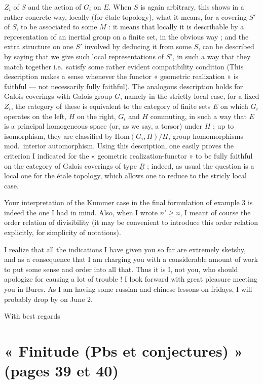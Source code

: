 \documentclass[11pt,a4paper]{article}
\begin{document}
$Z_i$ of $S$ and the action of $G_i$ on $E$. When $S$ is again arbitrary, this
shows in a rather concrete way, locally (for étale topology), what it means,
for a covering $S'$ of $S$, to be associated to some $M$ : it means that
locally it is describable by a representation of an inertial group on a finite
set, in the obvious way ; and the extra structure on one $S'$ involved by
deducing it from some $S$, can be described by saying that we give such local
representations of $S'$, in such a way that they match together i.e.\ satisfy
some rather evident compatibility condition (This description makes a sense
whenever the functor « geometric realization » is faithful --- not necessarily
fully faithful). The analogous description holds for Galois coverings with
Galois group $G$, namely in the strictly local case, for a fixed $Z_i$, the
\struck{\ill{}} category of these is equivalent to the category of finite sets
$E$ on which $G_i$ operates on the left, $H$ on the right, $G_i$ and $H$
commuting, in such a way that $E$ is a principal homogeneous space (or, as we
say, a torsor) under $H$ ; up to isomorphism, they are classified by
$\mathrm{Hom}(G_i, H)/H$, group homomorphisms mod.\ interior automorphism.
Using this description, one easily proves the criterion I indicated for the
« geometric realization-functor » to be fully faithful on the category of
Galois coverings of type $\underline{R}$ ; indeed, as usual the question is a
local one for the étale topology, which allows one to reduce to the stricly
local case.

Your interpretation of the Kummer case in the final formulation of example 3 is
indeed the one I had in mind. Also, when I wrote $n' \geqslant n$, I meant of
course the order relation of divisibility (it may be convenient to introduce
this order relation explicitly, for simplicity of notations).

I realize that all the indications I have given you so far are extremely
sketshy, and as a consequence that I am charging you with a considerable amount
of work to put some sense and order into all that. Thus it is I, not you, who
should apologize for causing a lot of trouble ! I look forward with great
pleasure meeting you in Bures. As I am having some russian and chinese lessons
on fridays, I will probably drop by on June 2.

With best regards

\section*{« Finitude (Pbs et conjectures) » (pages 39 et 40)}
\end{document}
